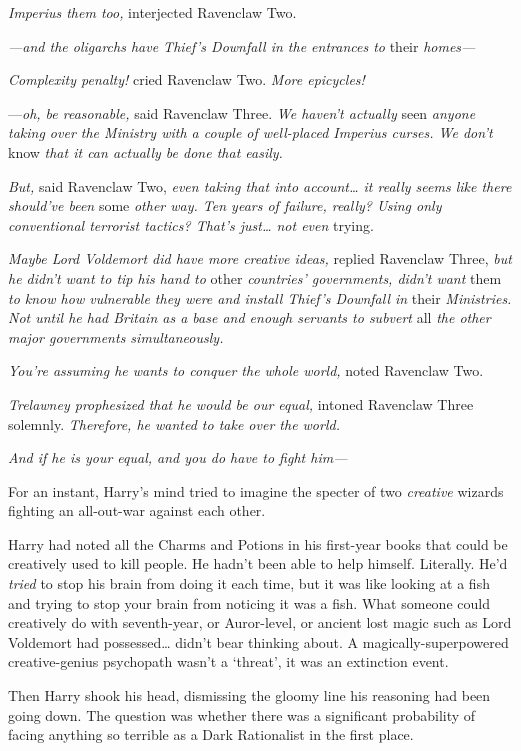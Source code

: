 \emph{Imperius them too,} interjected Ravenclaw Two.

\emph{---and the oligarchs have Thief's Downfall in the entrances to}
their \emph{homes---}

\emph{Complexity penalty!} cried Ravenclaw Two. \emph{More epicycles!}

---\emph{oh, be reasonable,} said Ravenclaw Three. \emph{We haven't actually}
seen \emph{anyone taking over the Ministry with a couple of well-placed
Imperius curses. We don't} know \emph{that it can actually be done that easily.}

\emph{But,} said Ravenclaw Two, \emph{even taking that into account{\ldots} it
really seems like there should've been} some \emph{other way. Ten years of
failure, really? Using only conventional terrorist tactics? That's just{\ldots}
not even} trying.

\emph{Maybe Lord Voldemort did have more creative ideas,} replied Ravenclaw
Three, \emph{but he didn't want to tip his hand to} other \emph{countries'
governments, didn't want} them \emph{to know how vulnerable they were and
install Thief's Downfall in} their \emph{Ministries. Not until he had Britain
as a base and enough servants to subvert} all \emph{the other major governments
simultaneously.}

\emph{You're assuming he wants to conquer the whole world,} noted Ravenclaw Two.

\emph{Trelawney prophesized that he would be our equal,} intoned Ravenclaw
Three solemnly. \emph{Therefore, he wanted to take over the world.}

\emph{And if he is your equal, and you do have to fight him---}

For an instant, Harry's mind tried to imagine the specter of two
\emph{creative} wizards fighting an all-out-war against each other.

Harry had noted all the Charms and Potions in his first-year books that could
be creatively used to kill people. He hadn't been able to help himself.
Literally. He'd \emph{tried} to stop his brain from doing it each time, but it
was like looking at a fish and trying to stop your brain from noticing it was a
fish. What someone could creatively do with seventh-year, or Auror-level, or
ancient lost magic such as Lord Voldemort had possessed{\ldots} didn't bear
thinking about. A magically-superpowered creative-genius psychopath wasn't a
`threat', it was an extinction event.

Then Harry shook his head, dismissing the gloomy line his reasoning had been
going down. The question was whether there was a significant probability of
facing anything so terrible as a Dark Rationalist in the first place.

